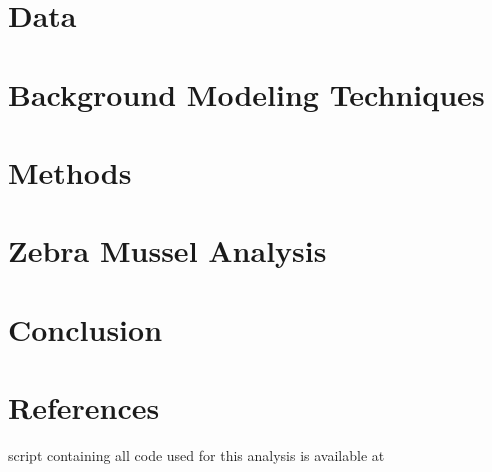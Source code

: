 \documentclass[12pt]{article}\usepackage[]{graphicx}\usepackage[]{color}
\begin{document}
\section{Data}


\section{Background Modeling Techniques}

  
\section{Methods}


\section{Zebra Mussel Analysis}


\section{Conclusion}


\newpage
\section{References}
\begingroup
\renewcommand{\section}[2]{}%
\begin{flushleft}

%
%
%
%

\end{flushleft}
\endgroup

\newpage
\section{Appendix - R Code}

A script containing all code used for this analysis is available at \\

\end{document}
